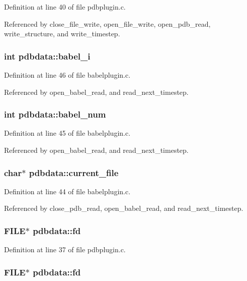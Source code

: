 Definition at line 40 of file pdbplugin.c.

Referenced by close\_\-file\_\-write, open\_\-file\_\-write, open\_\-pdb\_\-read, write\_\-structure, and write\_\-timestep.
\subsubsection{\setlength{\rightskip}{0pt plus 5cm}int pdbdata::babel\_\-i}\label{structpdbdata_m5}




Definition at line 46 of file babelplugin.c.

Referenced by open\_\-babel\_\-read, and read\_\-next\_\-timestep.
\subsubsection{\setlength{\rightskip}{0pt plus 5cm}int pdbdata::babel\_\-num}\label{structpdbdata_m4}




Definition at line 45 of file babelplugin.c.

Referenced by open\_\-babel\_\-read, and read\_\-next\_\-timestep.
\subsubsection{\setlength{\rightskip}{0pt plus 5cm}char$\ast$ pdbdata::current\_\-file}\label{structpdbdata_m3}




Definition at line 44 of file babelplugin.c.

Referenced by close\_\-pdb\_\-read, open\_\-babel\_\-read, and read\_\-next\_\-timestep.
\subsubsection{\setlength{\rightskip}{0pt plus 5cm}FILE$\ast$ pdbdata::fd}\label{structpdbdata_m6}




Definition at line 37 of file pdbplugin.c.
\subsubsection{\setlength{\rightskip}{0pt plus 5cm}FILE$\ast$ pdbdata::fd}\label{structpdbdata_m0}




